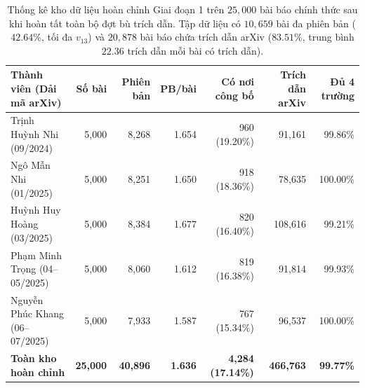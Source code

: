 \begin{table}[htbp]
    \centering
    \footnotesize
    \setlength{\tabcolsep}{5pt}
    \renewcommand{\arraystretch}{1.24}
    \begin{tabularx}{\textwidth}{X r r r r r r}
        \toprule
        \textbf{Thành viên (Dải mã arXiv)} & \textbf{Số bài} & \textbf{Phiên bản} & \textbf{PB/bài} & \textbf{Có nơi công bố} & \textbf{Trích dẫn arXiv} & \textbf{Đủ 4 trường} \\
        \midrule
        Trịnh Huỳnh Nhi (09/2024) & 5,000 & 8,268 & 1.654 & 960 (19.20\%) & 91,161 & 99.86\% \\
        Ngô Mẫn Nhi (01/2025) & 5,000 & 8,251 & 1.650 & 918 (18.36\%) & 78,635 & 100.00\% \\
        Huỳnh Huy Hoàng (03/2025) & 5,000 & 8,384 & 1.677 & 820 (16.40\%) & 108,616 & 99.21\% \\
        Phạm Minh Trọng (04--05/2025) & 5,000 & 8,060 & 1.612 & 819 (16.38\%) & 91,814 & 99.93\% \\
        Nguyễn Phúc Khang (06--07/2025) & 5,000 & 7,933 & 1.587 & 767 (15.34\%) & 96,537 & 100.00\% \\
        \midrule
        \textbf{Toàn kho hoàn chỉnh} & \textbf{25,000} & \textbf{40,896} & \textbf{1.636} & \textbf{4,284 (17.14\%)} & \textbf{466,763} & \textbf{99.77\%} \\
        \bottomrule
    \end{tabularx}
    \caption[Thống kê kho dữ liệu hoàn chỉnh Giai đoạn 1 trên 25{,}000 bài báo]{Thống kê kho dữ liệu hoàn chỉnh Giai đoạn 1 trên $25{,}000$ bài báo chính thức sau khi hoàn tất toàn bộ đợt bù trích dẫn. Tập dữ liệu có $10{,}659$ bài đa phiên bản ($42.64\%$, tối đa $v_{13}$) và $20{,}878$ bài báo chứa trích dẫn arXiv ($83.51\%$, trung bình $22.36$ trích dẫn mỗi bài có trích dẫn).}
    \label{tab:m1_final_corpus}
\end{table}

